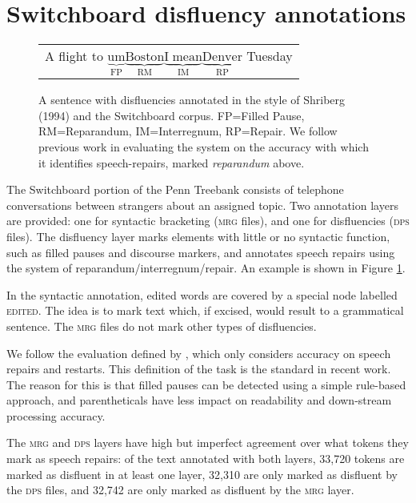 \documentclass[11pt,letterpaper]{article}
\begin{document}
\section{Switchboard disfluency annotations}
\label{sec:swbd}

\begin{figure}
    \begin{tabular}{l}

        A flight to $\underbrace{\mathrm{um}}_\text{FP} \underbrace{\mathrm{Boston}}_\text{RM} \underbrace{\mathrm{I\;mean}}_\text{IM} \underbrace{\mathrm{Denver}}_\text{RP}$ Tuesday\\

\end{tabular}
\caption{\small A sentence with disfluencies annotated in the style of Shriberg (1994) 
    and the Switchboard corpus.
FP=Filled Pause, RM=Reparandum, IM=Interregnum, RP=Repair.
We follow previous work in evaluating the system on the accuracy with which
it identifies speech-repairs, marked \emph{reparandum} above.
\label{fig:shriberg}}
\vspace*{-1.5em}
\end{figure}

The Switchboard portion of the Penn Treebank \citep{marcus:93} consists of
telephone conversations between strangers about
an assigned topic.  Two annotation layers are provided: one for syntactic
bracketing (\textsc{mrg} files),
and one for disfluencies (\textsc{dps} files). 
The disfluency layer marks
elements with little or no syntactic function, such as filled pauses and discourse
markers, and annotates speech repairs using the \citet{shriberg:94} system of
reparandum/interregnum/repair. An example is shown in Figure \ref{fig:shriberg}.


In the syntactic annotation, edited words are covered by a special node labelled
\textsc{edited}.
The idea is to mark text which, if
excised, would result to a grammatical sentence.
The \textsc{mrg} files do not mark other types of disfluencies.

We follow the evaluation defined by \citet{Charniak01a}, which only considers
accuracy on speech repairs and restarts.  This definition of the task is the 
standard in recent work. The reason for this is that filled pauses can be
detected using a simple rule-based approach, and parentheticals have less impact
on readability and down-stream processing accuracy.

The \textsc{mrg} and \textsc{dps} layers have high but imperfect agreement over
what tokens they mark as speech repairs: of the text annotated with both layers,
33,720 tokens are marked as disfluent in at least one layer, 32,310 are only marked
as disfluent by the \textsc{dps} files, and 32,742 are only marked as disfluent
by the \textsc{mrg} layer.
\end{document}
